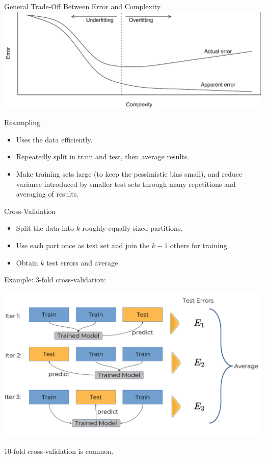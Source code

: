     \begin{frame}[c]{General Trade-Off Between Error and Complexity}
    \includegraphics[width=\textwidth]{overfitting}
    \end{frame}

    \begin{frame}[c]{Resampling}
        \begin{itemize}
            \item Uses the data efficiently.
            \item Repeatedly split in train and test, then average results.
            \item Make training sets large (to keep the pessimistic bias small),
                and reduce variance introduced by smaller test sets through many
                repetitions and averaging of results.
        \end{itemize}
    \end{frame}

    \begin{frame}[c]{Cross-Validation}

    \begin{itemize}
      \item Split the data into $k$ roughly equally-sized partitions.
      \item Use each part once as test set and join the $k-1$ others for training
      \item Obtain $k$ test errors and average
    \end{itemize}

    Example: 3-fold cross-validation:

    \begin{center}
    \includegraphics[height=.5\textheight]{crossvalidation.png}
    \end{center}
    10-fold cross-validation is common.
    \end{frame}

